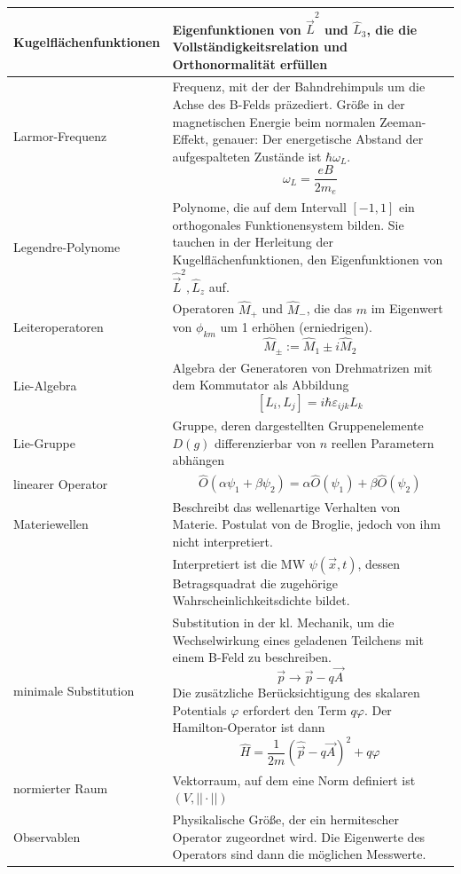 \documentclass{article}
\begin{document}
\begin{xltabular}{\linewidth}{l|X}
	\hline
		Kugelflächenfunktionen & Eigenfunktionen von $\hat{\vec{L}}^2$ und  $\hat{L}_3$, die die Vollständigkeitsrelation und Orthonormalität erfüllen \\
	\hline
		Larmor-Frequenz & Frequenz, mit der der Bahndrehimpuls um die Achse des B-Felds präzediert. Größe in der magnetischen Energie beim normalen Zeeman-Effekt, genauer: Der energetische Abstand der aufgespalteten Zustände ist $\hbar\omega_L$.
			$$\omega_L = \frac{eB}{2m_e}$$\\
	\hline
		Legendre-Polynome & Polynome, die auf dem Intervall $[-1,1]$ ein orthogonales Funktionensystem bilden. Sie tauchen in der Herleitung der Kugelflächenfunktionen, den Eigenfunktionen von $\hat{\vec{L}}^2, \hat{L}_z$ auf. \\
	\hline
		Leiteroperatoren & Operatoren $\hat{M}_+$ und $\hat{M}_-$, die das $m$ im Eigenwert von $\phi_{km}$ um 1 erhöhen (erniedrigen).
			$$\hat{M}_\pm := \hat{M}_1\pm i\hat{M}_2$$\\
	\hline
		Lie-Algebra & Algebra der Generatoren von Drehmatrizen mit dem Kommutator als Abbildung
			$$[L_i, L_j] = i\hbar\varepsilon_{ijk} L_k$$ \\
	\hline
		Lie-Gruppe & Gruppe, deren dargestellten Gruppenelemente $D(g)$ differenzierbar von $n$ reellen Parametern abhängen \\
	\hline
		linearer Operator & $$\hat{O}(\alpha\psi_1 + \beta\psi_2) = \alpha\hat{O}(\psi_1) + \beta\hat{O}(\psi_2)$$ \\
	\hline
		Materiewellen & Beschreibt das wellenartige Verhalten von Materie. Postulat von de Broglie, jedoch von ihm nicht interpretiert.\\
		& Interpretiert ist die MW $\psi(\vec{x},t)$, dessen Betragsquadrat die zugehörige Wahrscheinlichkeitsdichte bildet. \\
	\hline
		minimale Substitution & Substitution in der kl. Mechanik, um die Wechselwirkung eines geladenen Teilchens mit einem B-Feld zu beschreiben.
			$$\vec{p} \to \vec{p} - q\vec{A}$$
		Die zusätzliche Berücksichtigung des skalaren Potentials $\varphi$ erfordert den Term $q\varphi$. Der Hamilton-Operator ist dann
			$$\hat{H} = \frac{1}{2m} (\hat{\vec{p}} - q\vec{A})^2 + q\varphi$$\\
	\hline
		normierter Raum & Vektorraum, auf dem eine Norm definiert ist $(V,||\cdot ||)$ \\
	\hline
		Observablen & Physikalische Größe, der ein hermitescher Operator zugeordnet wird. Die Eigenwerte des Operators sind dann die möglichen Messwerte. \\

\end{xltabular}
\end{document}
